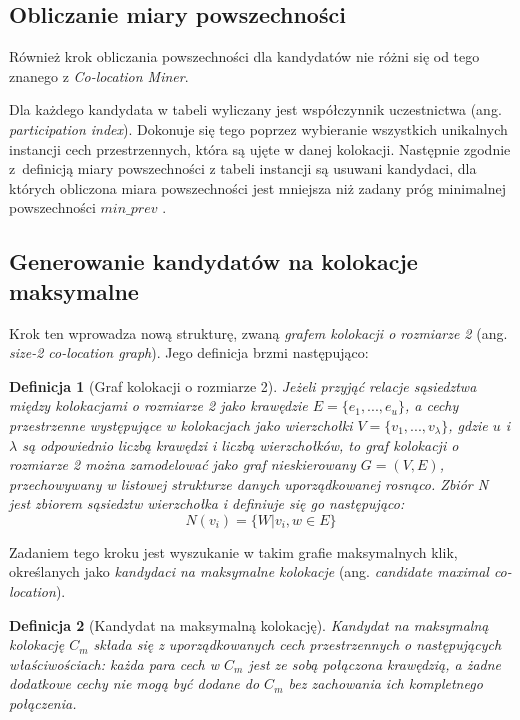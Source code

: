 \documentclass[12pt]{article}
\newtheorem{defin}{Definicja}
\begin{document}
\subsection{Obliczanie miary powszechności}

Również krok obliczania powszechności dla kandydatów nie różni się od tego znanego z \textit{Co-location Miner}.

Dla każdego kandydata w tabeli wyliczany jest współczynnik uczestnictwa (ang. \textit{participation index}). Dokonuje się tego poprzez wybieranie wszystkich unikalnych instancji cech przestrzennych, która są ujęte w danej kolokacji. Następnie zgodnie z~definicją miary powszechności z tabeli instancji są usuwani kandydaci, dla których obliczona miara powszechności jest mniejsza niż zadany próg minimalnej powszechności $ min\_prev $ \cite{huang}. 

\subsection{Generowanie kandydatów na kolokacje maksymalne}

Krok ten wprowadza nową strukturę, zwaną \textit{grafem kolokacji o rozmiarze 2} (ang. \textit{size-2 co-location graph}). Jego definicja brzmi następująco:

\begin{defin}[Graf kolokacji o rozmiarze 2]
Jeżeli przyjąć relacje sąsiedztwa między kolokacjami o rozmiarze 2 jako krawędzie $ E = \{e_{1},...,e_{u}\}$, a cechy przestrzenne występujące w kolokacjach jako wierzchołki $ V = \{v_{1},...,v_{\lambda}\}$, gdzie $ u $ i $ \lambda $ są odpowiednio liczbą krawędzi i liczbą wierzchołków, to graf kolokacji o rozmiarze 2 można zamodelować jako graf nieskierowany $ G= (V, E)$, przechowywany w listowej strukturze danych uporządkowanej rosnąco. Zbiór N jest zbiorem sąsiedztw wierzchołka i definiuje się go następująco:
\begin{equation}
N(v_{i}) = \{W|{v_{i},w} \in E\}
\end{equation}
\label{def:size2-col-graph}
\end{defin}

Zadaniem tego kroku jest wyszukanie w takim grafie maksymalnych klik, określanych jako \textit{kandydaci na maksymalne kolokacje} (ang. \textit{candidate maximal co-location}).

\begin{defin}[Kandydat na maksymalną kolokację]
Kandydat na maksymalną kolokację $ C_{m} $ składa się z uporządkowanych cech przestrzennych o następujących właściwościach: każda para cech w  $ C_{m} $  jest ze sobą połączona krawędzią, a żadne dodatkowe cechy nie mogą być dodane do $ C_{m} $ bez zachowania ich kompletnego połączenia.
\end{defin}
\end{document}

